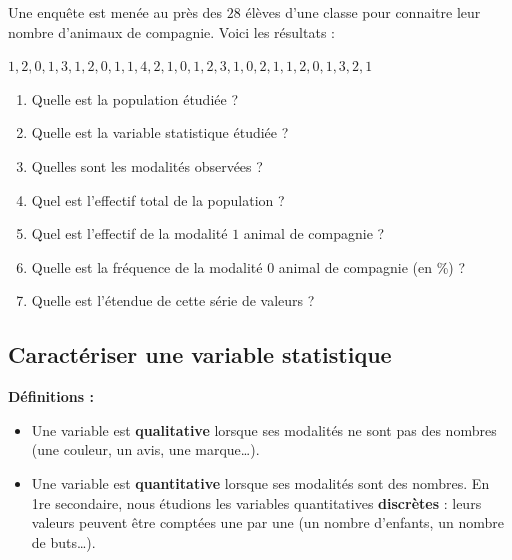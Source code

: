 \documentclass[../../syllabus_1.tex]{subfiles}
\begin{document}
\newpage
\begin{exercise}
    Une enquête est menée au près des $28$ élèves d'une classe pour connaitre leur nombre d'animaux de compagnie. Voici les résultats :
    \begin{center}
        $1, 2, 0, 1, 3, 1, 2, 0, 1, 1, 4, 2, 1, 0, 1, 2, 3, 1, 0, 2, 1, 1, 2, 0, 1, 3, 2, 1$
    \end{center}
    \begin{enumerate}[itemsep=1cm]
        \item Quelle est la population étudiée ?
        \item Quelle est la variable statistique étudiée ?
        \item Quelles sont les modalités observées ?
        \item Quel est l'effectif total de la population ?
        \item Quel est l'effectif de la modalité $1$ animal de compagnie  ?
        \item Quelle est la fréquence de la modalité $0$ animal de compagnie (en \%) ?
        \item Quelle est l'étendue de cette série de valeurs ?
    \end{enumerate}
\end{exercise}

\subsection{Caractériser une variable statistique}

\textbf{Définitions :}
\begin{itemize}
    \item Une variable est \textbf{qualitative} lorsque ses modalités ne sont pas des nombres (une couleur, un avis, une marque\dots).
    \item Une variable est \textbf{quantitative} lorsque ses modalités sont des nombres. En 1re secondaire, nous étudions les variables quantitatives \textbf{discrètes} : leurs valeurs peuvent être comptées une par une (un nombre d'enfants, un nombre de buts\dots).
\end{itemize}
\end{document}
